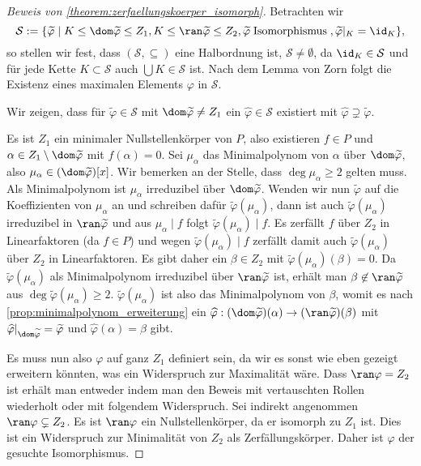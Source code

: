 \begin{proof}[Beweis von \cref{theorem:zerfaellungskoerper_isomorph}]
    Betrachten wir $$\mathcal{S} := \{\widetilde{\varphi} \mid K\le \dom \widetilde\varphi \le Z_1, K\le \ran \widetilde\varphi \le Z_2, \widetilde\varphi\;\text{Isomorphismus}\;, \widetilde\varphi\vert_K = \id_K \},$$
    so stellen wir fest, dass $(\mathcal{S}, \subseteq)$ eine Halbordnung ist, $\mathcal{S} \neq \emptyset$, da $\id_K \in \mathcal{S}$ und für jede Kette $K \subset \mathcal{S}$ auch $\bigcup K \in \mathcal{S}$ ist. Nach dem Lemma von Zorn folgt die Existenz eines maximalen Elements $\varphi$ in $\mathcal{S}$.

    Wir zeigen, dass für $\widetilde\varphi \in \mathcal{S}$ mit $\dom \widetilde\varphi \neq Z_1$ ein $\widehat\varphi \in \mathcal{S}$ existiert mit $\widehat\varphi \supsetneq \widetilde\varphi$.
    
    Es ist $Z_1$ ein minimaler Nullstellenkörper von $P$, also existieren $f \in P$ und $\alpha \in Z_1\setminus\dom \widetilde{\varphi}$ mit $f(\alpha) = 0$. Sei $\mu_\alpha$ das Minimalpolynom von $\alpha$ über $\dom \widetilde\varphi$, also $\mu_\alpha \in (\dom \widetilde\varphi)[x]$. Wir bemerken an der Stelle, dass $\deg\mu_\alpha\ge 2$ gelten muss. Als Minimalpolynom ist $\mu_\alpha$ irreduzibel über $\dom \widetilde\varphi$. Wenden wir nun $\widetilde\varphi$ auf die Koeffizienten von $\mu_\alpha$ an und schreiben dafür $\widetilde\varphi(\mu_\alpha)$, dann ist auch $\widetilde\varphi(\mu_\alpha)$ irreduzibel in $\ran \widetilde\varphi$ und aus $\mu_\alpha \mid f$ folgt $\widetilde\varphi(\mu_\alpha) \mid f$. 
    Es zerfällt $f$ über $Z_2$ in Linearfaktoren (da $f \in P$) und wegen $\widetilde\varphi(\mu_\alpha) \mid f$ zerfällt damit auch $\widetilde\varphi(\mu_\alpha)$ über $Z_2$ in Linearfaktoren. Es gibt daher ein $\beta \in Z_2$ mit $\widetilde\varphi(\mu_\alpha)(\beta) = 0$. Da $\widetilde\varphi(\mu_\alpha)$ als Minimalpolynom irreduzibel über $\ran \widetilde\varphi$ ist, erhält man $\beta \not\in \ran \widetilde\varphi$ aus $\deg \widetilde{\varphi}(\mu_\alpha)\geq 2$.  $\widetilde\varphi(\mu_\alpha)$ ist also das Minimalpolynom von $\beta$, womit es nach \cref{prop:minimalpolynom_erweiterung} ein $\widehat\varphi: (\dom \widetilde\varphi)(\alpha) \to (\ran \widetilde\varphi)(\beta)$ mit $\widehat\varphi\vert_{\dom \widetilde\varphi} = \widetilde\varphi$ und $\widehat\varphi(\alpha) = \beta$ gibt.

    Es muss nun also $\varphi$ auf ganz $Z_1$ definiert sein, da wir es sonst wie eben gezeigt erweitern könnten, was ein Widerspruch zur Maximalität wäre. Dass $\ran \varphi = Z_2$ ist erhält man entweder indem man den Beweis mit vertauschten Rollen wiederholt oder mit folgendem Widerspruch. Sei indirekt angenommen $\ran \varphi \subsetneq Z_2$. Es ist $\ran \varphi$ ein Nullstellenkörper, da er isomorph zu $Z_1$ ist. Dies ist ein Widerspruch zur Minimalität von $Z_2$ als Zerfällungskörper. Daher ist $\varphi$ der gesuchte Isomorphismus.
\end{proof}

